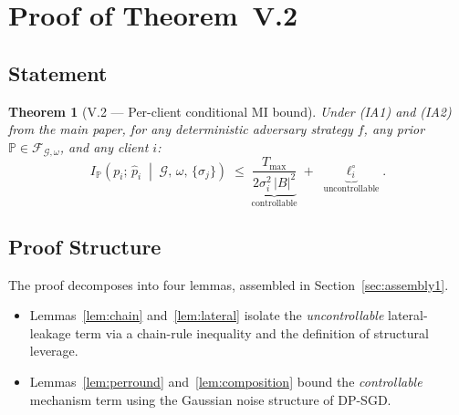 \documentclass[letterpaper,journal]{IEEEtran}
\newtheorem*{theoremstar}{Theorem}
\newcommand{\TOPO}{\mathcal{G}}
\newcommand{\FAM}{\mathcal{F}}
\newcommand{\Tmax}{T_{\max}}
\begin{document}



\appendix

\section{Proof of Theorem~V.2}
\label{app:thm1}

\subsection{Statement}

\begin{theoremstar}[V.2 \textnormal{---} Per-client conditional
MI bound]
Under (IA1) and (IA2) from the main paper, for any deterministic
adversary strategy $f$, any prior $\mathbb{P} \in
\FAM_{\TOPO,\omega}$, and any client $i$:
\begin{equation}
I_{\mathbb{P}}\!\left(p_i;\,\hat{p}_i \;\middle|\;
\TOPO,\,\omega,\,\{\sigma_j\}\right)
\;\leq\;
\underbrace{\frac{\Tmax}{2\sigma_i^2\,|B|^2}}_{\text{controllable}}
\;+\;
\underbrace{\ell_i^\circ}_{\text{uncontrollable}}.
\label{eq:thm1-supp}
\end{equation}
\end{theoremstar}

\subsection{Proof Structure}

\noindent The proof decomposes into four lemmas, assembled in
Section~\ref{sec:assembly1}.

\begin{itemize}
\item Lemmas~\ref{lem:chain} and~\ref{lem:lateral} isolate the
      \emph{uncontrollable} lateral-leakage term via a chain-rule
      inequality and the definition of structural leverage.
\item Lemmas~\ref{lem:perround} and~\ref{lem:composition} bound
      the \emph{controllable} mechanism term using the Gaussian
      noise structure of DP-SGD.\medskip
\end{itemize}
\end{document}
